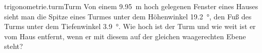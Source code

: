 \begin{exercise}{trigonometrie.turm}{Turm}
  \ifproblem\problem
    Von einem \SI{9.95}{\metre} hoch gelegenen Fenster eines
    Hauses sieht man die Spitze eines Turmes unter dem Höhenwinkel
    \SI{19.2}{\degree}, den Fuß des Turms unter dem Tiefenwinkel
    \SI{3.9}{\degree}. Wie hoch ist der Turm und wie weit ist er
    vom Haus entfernt, wenn er mit diesem auf der gleichen
    waagerechten Ebene steht?
  \fi
\end{exercise}

